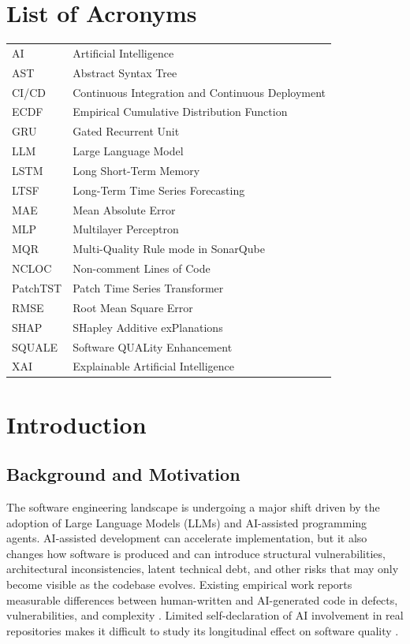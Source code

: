 \documentclass[12pt,a4paper,oneside]{report}
\begin{document}
\chapter*{List of Acronyms}
\begin{longtable}{p{}p{}}
AI & Artificial Intelligence \\
AST & Abstract Syntax Tree \\
CI/CD & Continuous Integration and Continuous Deployment \\
ECDF & Empirical Cumulative Distribution Function \\
GRU & Gated Recurrent Unit \\
LLM & Large Language Model \\
LSTM & Long Short-Term Memory \\
LTSF & Long-Term Time Series Forecasting \\
MAE & Mean Absolute Error \\
MLP & Multilayer Perceptron \\
MQR & Multi-Quality Rule mode in SonarQube \\
NCLOC & Non-comment Lines of Code \\
PatchTST & Patch Time Series Transformer \\
RMSE & Root Mean Square Error \\
SHAP & SHapley Additive exPlanations \\
SQUALE & Software QUALity Enhancement \\
XAI & Explainable Artificial Intelligence \\
\end{longtable}

\tableofcontents
\clearpage
{}

\chapter{Introduction}
\label{ch:introduction}

\section{Background and Motivation}
The software engineering landscape is undergoing a major shift driven by the adoption of Large Language Models (LLMs) and AI-assisted programming agents. AI-assisted development can accelerate implementation, but it also changes how software is produced and can introduce structural vulnerabilities, architectural inconsistencies, latent technical debt, and other risks that may only become visible as the codebase evolves. Existing empirical work reports measurable differences between human-written and AI-generated code in defects, vulnerabilities, and complexity \citep{human_written_vs_ai_generated_code_2025}. Limited self-declaration of AI involvement in real repositories makes it difficult to study its longitudinal effect on software quality \citep{developers_self_declaration_ai_generated_code}.
\end{document}
